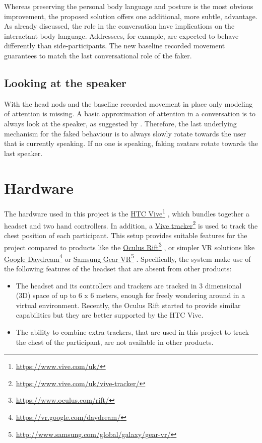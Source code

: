 \documentclass[]{simple-thesis}
\newcommand\fnurl[2]{%
  \href{#2}{#1}\footnote{\url{#2}}%
}
\begin{document}
Whereas preserving the personal body language and posture is the most obvious improvement, the proposed solution offers one additional, more subtle, advantage.
As already discussed, the role in the conversation have implications on the interactant body language.
Addressees, for example, are expected to behave differently than side-participants.
The new baseline recorded movement guarantees to match the last conversational role of the faker.

\subsection{Looking at the speaker}

With the head nods and the baseline recorded movement in place only modeling of attention is missing.
A basic approximation of attention in a conversation is to always look at the speaker, as suggested by \cite{Fujie2009}.
Therefore, the last underlying mechanism for the faked behaviour is to always slowly rotate towards the user that is currently speaking.
If no one is speaking, faking avatars rotate towards the last speaker.

\section{Hardware}

The hardware used in this project is the \fnurl{HTC Vive}{https://www.vive.com/uk/}, which bundles together a headset and two hand controllers.
In addition, a \fnurl{Vive tracker}{https://www.vive.com/uk/vive-tracker/} is used to track the chest position of each participant.
This setup provides suitable features for the project compared to products like the \fnurl{Oculus Rift}{https://www.oculus.com/rift/}, or simpler VR solutions like \fnurl{Google Daydream}{https://vr.google.com/daydream/} or \fnurl{Samsung Gear VR}{http://www.samsung.com/global/galaxy/gear-vr/}.
Specifically, the system make use of the following features of the headset that are absent from other products:

\begin{itemize}
  \item The headset and its controllers and trackers are tracked in 3 dimensional (3D) space of up to 6 x 6 meters, enough for freely wondering around in a virtual environment. Recently, the Oculus Rift started to provide similar capabilities but they are better supported by the HTC Vive.
  \item The ability to combine extra trackers, that are used in this project to track the chest of the participant, are not available in other products.
\end{itemize}
\end{document}
